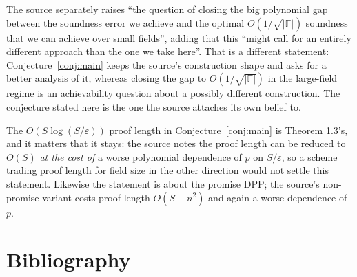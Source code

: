 \documentclass{aicr-conjecture}
\newcommand{\F}{\mathbb{F}}
\newcommand{\eps}{\varepsilon}
\begin{document}
\begin{remark}
The source separately raises ``the question of closing the big polynomial
gap between the soundness error we achieve and the optimal
$O(1/\sqrt{|\F|})$ soundness that we can achieve over small fields'',
adding that this ``might call for an entirely different approach than the
one we take here''. That is a different statement:
Conjecture~\ref{conj:main} keeps the source's construction shape and
asks for a better analysis of it, whereas closing the gap to
$O(1/\sqrt{|\F|})$ in the large-field regime is an achievability question
about a possibly different construction. The conjecture stated here is
the one the source attaches its own belief to.
\end{remark}

\begin{remark}
The $O(S \log(S/\eps))$ proof length in Conjecture~\ref{conj:main} is
Theorem 1.3's, and it matters that it stays: the source notes the proof
length can be reduced to $O(S)$ \emph{at the cost of} a worse polynomial
dependence of $p$ on $S/\eps$, so a scheme trading proof length for field
size in the other direction would not settle this statement. Likewise the
statement is about the promise DPP; the source's non-promise variant
costs proof length $O(S + n^{2})$ and again a worse dependence of $p$.
\end{remark}

\section{Bibliography}
\end{document}

